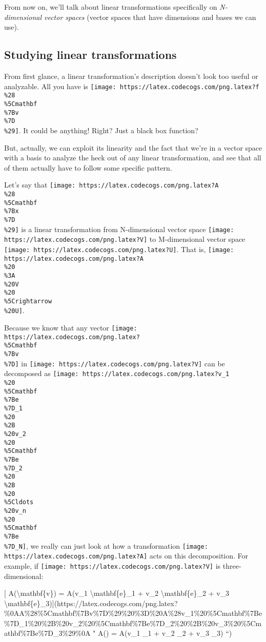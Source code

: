 \documentclass[]{article}
\begin{document}
From now on, we'll talk about linear transformations specifically on
\emph{N-dimensional vector spaces} (vector spaces that have dimensions and bases
we can use).

\hypertarget{studying-linear-transformations}{%
\subsection{Studying linear
transformations}\label{studying-linear-transformations}}

From first glance, a linear transformation's description doesn't look too useful
or analyzable. All you have is
\texttt{[image: https://latex.codecogs.com/png.latex?f\\\%28\\\%5Cmathbf\\\%7Bv\\\%7D\\\%29]}.
It could be anything! Right? Just a black box function?

But, actually, we can exploit its linearity and the fact that we're in a vector
space with a basis to analyze the heck out of any linear transformation, and see
that all of them actually have to follow some specific pattern.

Let's say that
\texttt{[image: https://latex.codecogs.com/png.latex?A\\\%28\\\%5Cmathbf\\\%7Bx\\\%7D\\\%29]}
is a linear transformation from N-dimensional vector space
\texttt{[image: https://latex.codecogs.com/png.latex?V]} to M-dimensional vector
space \texttt{[image: https://latex.codecogs.com/png.latex?U]}. That is,
\texttt{[image: https://latex.codecogs.com/png.latex?A\\\%20\\\%3A\\\%20V\\\%20\\\%5Crightarrow\\\%20U]}.

Because we know that any vector
\texttt{[image: https://latex.codecogs.com/png.latex?\\\%5Cmathbf\\\%7Bv\\\%7D]} in
\texttt{[image: https://latex.codecogs.com/png.latex?V]} can be decomposed as
\texttt{[image: https://latex.codecogs.com/png.latex?v\_1\\\%20\\\%5Cmathbf\\\%7Be\\\%7D\_1\\\%20\\\%2B\\\%20v\_2\\\%20\\\%5Cmathbf\\\%7Be\\\%7D\_2\\\%20\\\%2B\\\%20\\\%5Cldots\\\%20v\_n\\\%20\\\%5Cmathbf\\\%7Be\\\%7D\_N]},
we really can just look at how a transformation
\texttt{[image: https://latex.codecogs.com/png.latex?A]} acts on this
decomposition. For example, if
\texttt{[image: https://latex.codecogs.com/png.latex?V]} is three-dimensional:

{[} A(\textbackslash{}mathbf\{v\}) = A(v\_1 \textbackslash{}mathbf\{e\}\_1 +
v\_2 \textbackslash{}mathbf\{e\}\_2 + v\_3
\textbackslash{}mathbf\{e\}\_3){]}(https://latex.codecogs.com/png.latex?\%0AA\%28\%5Cmathbf\%7Bv\%7D\%29\%20\%3D\%20A\%28v\_1\%20\%5Cmathbf\%7Be\%7D\_1\%20\%2B\%20v\_2\%20\%5Cmathbf\%7Be\%7D\_2\%20\%2B\%20v\_3\%20\%5Cmathbf\%7Be\%7D\_3\%29\%0A
" A() = A(v\_1 \_1 + v\_2 \_2 + v\_3
\_3) ``)
\end{document}
